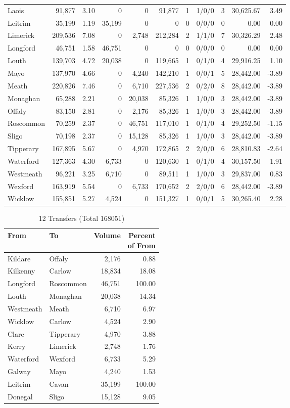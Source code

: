 \documentclass[a4paper]{article}
\begin{document}
\begin{longtable}{lrrrrrrlrrr}
Laois&91,877& 3.10&0&0&91,877&1&1/0/0&3&30,625.67& 3.49\\ 
Leitrim&35,199& 1.19&35,199&0&0&0&0/0/0&0& 0.00& 0.00\\ 
Limerick&209,536& 7.08&0&2,748&212,284&2&1/1/0&7&30,326.29& 2.48\\ 
Longford&46,751& 1.58&46,751&0&0&0&0/0/0&0& 0.00& 0.00\\ 
Louth&139,703& 4.72&20,038&0&119,665&1&0/1/0&4&29,916.25& 1.10\\ 
Mayo&137,970& 4.66&0&4,240&142,210&1&0/0/1&5&28,442.00&-3.89\\ 
Meath&220,826& 7.46&0&6,710&227,536&2&0/2/0&8&28,442.00&-3.89\\ 
Monaghan&65,288& 2.21&0&20,038&85,326&1&1/0/0&3&28,442.00&-3.89\\ 
Offaly&83,150& 2.81&0&2,176&85,326&1&1/0/0&3&28,442.00&-3.89\\ 
Roscommon&70,259& 2.37&0&46,751&117,010&1&0/1/0&4&29,252.50&-1.15\\ 
Sligo&70,198& 2.37&0&15,128&85,326&1&1/0/0&3&28,442.00&-3.89\\ 
Tipperary&167,895& 5.67&0&4,970&172,865&2&2/0/0&6&28,810.83&-2.64\\ 
Waterford&127,363& 4.30&6,733&0&120,630&1&0/1/0&4&30,157.50& 1.91\\ 
Westmeath&96,221& 3.25&6,710&0&89,511&1&1/0/0&3&29,837.00& 0.83\\ 
Wexford&163,919& 5.54&0&6,733&170,652&2&2/0/0&6&28,442.00&-3.89\\ 
Wicklow&155,851& 5.27&4,524&0&151,327&1&0/0/1&5&30,265.40& 2.28\\ 
\end{longtable}

\begin{table}[htbp]
\caption{12 Transfers (Total 168051)}
\centering
\begin{tabular}{llrr} \toprule
From &To &Volume &\shortstack{Percent\\of From} \\ \midrule
Kildare&Offaly&2,176& 0.88\\ 
Kilkenny&Carlow&18,834&18.08\\ 
Longford&Roscommon&46,751&100.00\\ 
Louth&Monaghan&20,038&14.34\\ 
Westmeath&Meath&6,710& 6.97\\ 
Wicklow&Carlow&4,524& 2.90\\ 
Clare&Tipperary&4,970& 3.88\\ 
Kerry&Limerick&2,748& 1.76\\ 
Waterford&Wexford&6,733& 5.29\\ 
Galway&Mayo&4,240& 1.53\\ 
Leitrim&Cavan&35,199&100.00\\ 
Donegal&Sligo&15,128& 9.05\\ 
\bottomrule
\end{tabular}
\end{table}
\end{document}
